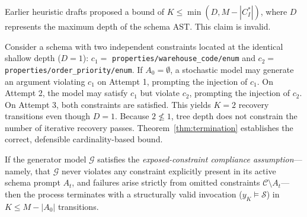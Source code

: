 \begin{remark}
Earlier heuristic drafts proposed a bound of $K \le \min(D, M - |C_I^*|)$, where $D$ represents the maximum depth of the schema AST. This claim is invalid. 

Consider a schema with two independent constraints located at the identical shallow depth ($D = 1$): $c_1 =$ \texttt{properties/warehouse\_code/enum} and $c_2 =$ \texttt{properties/order\_priority/enum}. If $A_0 = \emptyset$, a stochastic model may generate an argument violating $c_1$ on Attempt 1, prompting the injection of $c_1$. On Attempt 2, the model may satisfy $c_1$ but violate $c_2$, prompting the injection of $c_2$. On Attempt 3, both constraints are satisfied. This yields $K = 2$ recovery transitions even though $D = 1$. Because $2 \not\le 1$, tree depth does not constrain the number of iterative recovery passes. Theorem~\ref{thm:termination} establishes the correct, defensible cardinality-based bound.
\end{remark}

\begin{proposition}
If the generator model $\mathcal{G}$ satisfies the \emph{exposed-constraint compliance assumption}---namely, that $\mathcal{G}$ never violates any constraint explicitly present in its active schema prompt $A_t$, and failures arise strictly from omitted constraints $\mathcal{C} \setminus A_t$---then the process terminates with a structurally valid invocation ($y_K \models \mathcal{S}$) in $K \le M - |A_0|$ transitions.
\end{proposition}
